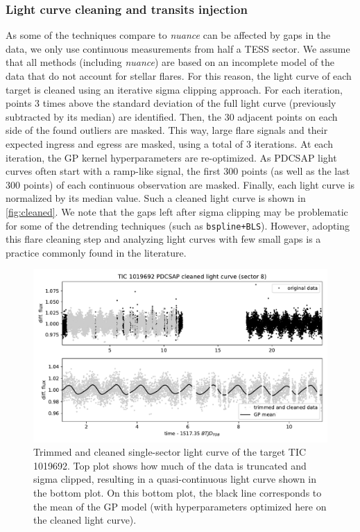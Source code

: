 \documentclass[modern]{aastex631}
\newcommand{\nuancemethod}{\textit{nuance}}
\newcommand{\nuance}{\nuancemethod{}}
\begin{document}
\subsubsection*{Light curve cleaning and transits injection}

As some of the techniques compare to \nuance{} can be affected by gaps in the data, we only use continuous measurements from half a TESS sector. We assume that all methods (including \nuance{}) are based on an incomplete model of the data that do not account for stellar flares. For this reason, the light curve of each target is cleaned using an iterative sigma clipping approach. For each iteration, points 3 times above the standard deviation of the full light curve (previously subtracted by its median) are identified. Then, the 30 adjacent points on each side of the found outliers are masked. This way, large flare signals and their expected ingress and egress are masked, using a total of 3 iterations. At each iteration, the GP kernel hyperparameters are re-optimized. As PDCSAP light curves often start with a ramp-like signal, the first 300 points (as well as the last 300 points) of each continuous observation are masked. Finally, each light curve is normalized by its median value. Such a cleaned light curve is shown in \autoref{fig:cleaned}. We note that the gaps left after sigma clipping may be problematic for some of the detrending techniques (such as \texttt{bspline+BLS}). However, adopting this flare cleaning step and analyzing light curves with few small gaps is a practice commonly found in the literature.
\begin{figure}[H]
    \centering
    \includegraphics[width=\linewidth]{../workflows/tess_injection_recovery/figures/cleaned/1019692.pdf}
    \caption{Trimmed and cleaned single-sector light curve of the target TIC 1019692. Top plot shows how much of the data is truncated and sigma clipped, resulting in a quasi-continuous light curve shown in the bottom plot. On this bottom plot, the black line corresponds to the mean of the GP model (with hyperparameters optimized here on the cleaned light curve).}
    \label{fig:cleaned}
\end{figure}
\end{document}
